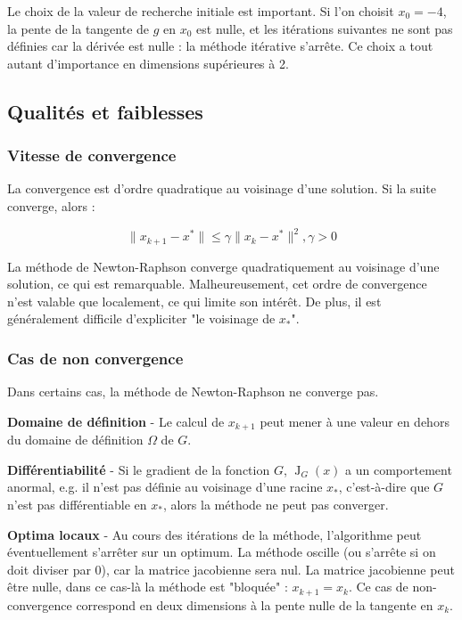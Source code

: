\documentclass[3p, twocolumn]{elsarticle}
\DeclareMathOperator{\Jacobian}{J}
\begin{document}
\begin{rmk}
    Le choix de la valeur de recherche initiale est important. Si l'on choisit $x_0=-4$, la pente de la tangente de $g$ en $x_0$ est nulle, et les itérations suivantes ne sont pas définies car la dérivée est nulle : la méthode itérative s'arrête. Ce choix a tout autant d'importance en dimensions supérieures à 2.
\end{rmk}


\subsection{Qualités et faiblesses}
\subsubsection{Vitesse de convergence}
La convergence est d'ordre quadratique au voisinage d'une solution. Si la suite converge, alors :

\begin{equation*}
    \lVert x_{k+1}-x^{*}\rVert \leq \gamma\lVert x_{k}- x^{*}\rVert^{2}, \gamma >0
    \label{eq:convergence-nr}
\end{equation*}

La méthode de Newton-Raphson converge quadratiquement au voisinage d'une solution, ce qui est remarquable. Malheureusement, cet ordre de convergence n'est valable que localement, ce qui limite son intérêt. De plus, il est généralement difficile d'expliciter "le voisinage de $x_*$".

\subsubsection{Cas de non convergence}
Dans certains cas, la méthode de Newton-Raphson ne converge pas.

 \textbf{Domaine de définition} - Le calcul de $x_{k+1}$ peut mener à une valeur en dehors du domaine de définition $\Omega$ de $G$.

 \textbf{Différentiabilité} - Si le gradient de la fonction $G$, $\Jacobian_G(x)$ a un comportement anormal, e.g. il n'est pas définie au voisinage d'une racine $x_*$, c'est-à-dire que $G$ n'est pas différentiable en $x_*$, alors la méthode ne peut pas converger.

 \textbf{Optima locaux} - Au cours des itérations de la méthode, l'algorithme peut éventuellement s'arrêter sur un optimum. La méthode oscille (ou s'arrête si on doit diviser par 0), car la matrice jacobienne sera nul. La matrice jacobienne peut être nulle, dans ce cas-là la méthode est "bloquée" : $x_{k+1} = x_k$. Ce cas de non-convergence correspond en deux dimensions à la pente nulle de la tangente en $x_k$.
\end{document}
